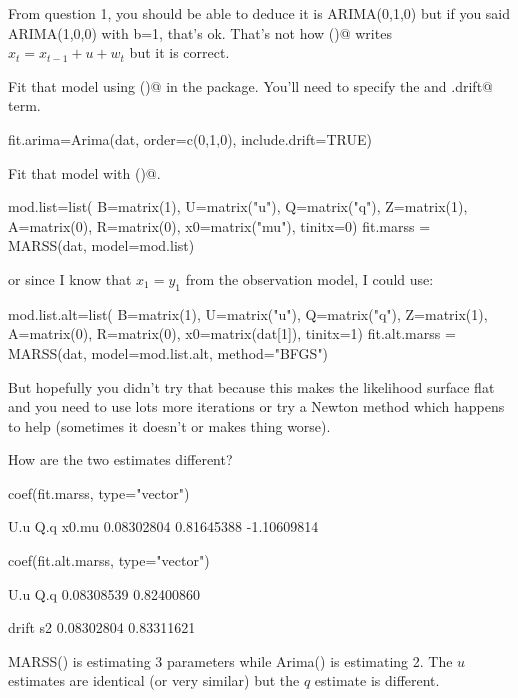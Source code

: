 \begin{wideenumerate}
\smallskip
From question 1, you should be able to deduce it is ARIMA(0,1,0) but if you said ARIMA(1,0,0) with b=1, that's ok.  That's not how \verb@Arima()@ writes $x_t = x_{t-1} + u + w_t$ but it is correct.
\item Fit that model using \verb@Arima()@ in the \verb@forecast@ package.  You'll need to specify the \verb@order@ and \verb@include.drift@ term.  
\begin{Schunk}
\begin{Sinput}
 fit.arima=Arima(dat, order=c(0,1,0), include.drift=TRUE)
\end{Sinput}
\end{Schunk}
\item Fit that model with \verb@MARSS()@.
\begin{Schunk}
\begin{Sinput}
 mod.list=list(
   B=matrix(1), U=matrix("u"), Q=matrix("q"),
   Z=matrix(1), A=matrix(0), R=matrix(0),
   x0=matrix("mu"), tinitx=0)
 fit.marss = MARSS(dat, model=mod.list)
\end{Sinput}
\end{Schunk}
or since I know that $x_1 = y_1$ from the observation model, I could use:
\begin{Schunk}
\begin{Sinput}
 mod.list.alt=list(
   B=matrix(1), U=matrix("u"), Q=matrix("q"),
   Z=matrix(1), A=matrix(0), R=matrix(0),
   x0=matrix(dat[1]), tinitx=1)
 fit.alt.marss = MARSS(dat, model=mod.list.alt, method="BFGS")
\end{Sinput}
\end{Schunk}
But hopefully you didn't try that because this makes the likelihood surface flat and you need to use lots more iterations or try a Newton method which happens to help (sometimes it doesn't or makes thing worse).
\item How are the two estimates different?
\begin{Schunk}
\begin{Sinput}
 coef(fit.marss, type="vector")
\end{Sinput}
\begin{Soutput}
        U.u         Q.q       x0.mu 
 0.08302804  0.81645388 -1.10609814 
\end{Soutput}
\begin{Sinput}
 coef(fit.alt.marss, type="vector")
\end{Sinput}
\begin{Soutput}
       U.u        Q.q 
0.08308539 0.82400860 
\end{Soutput}
\begin{Soutput}
     drift         s2 
0.08302804 0.83311621 
\end{Soutput}
\end{Schunk}
MARSS() is estimating 3 parameters while Arima() is estimating 2.  The $u$ estimates are identical (or very similar) but the $q$ estimate is different.


\end{wideenumerate}
